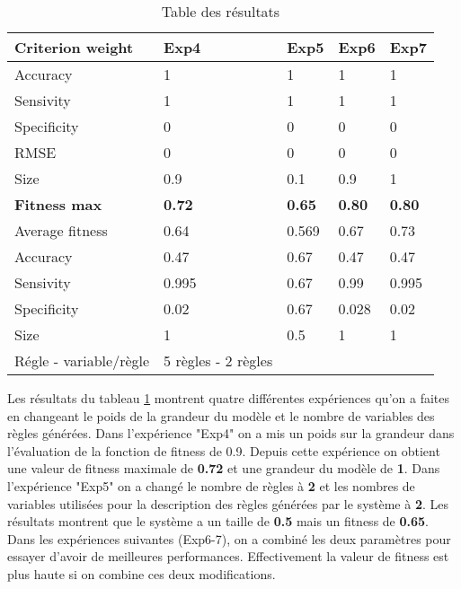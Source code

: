 \begin{table}[h]
  \centering
  \begin{tabular}{|l|l|l|l|l|}
  \hline
  \textbf{Criterion weight} & \textbf{Exp4} & \textbf{Exp5} & \textbf{Exp6} & \textbf{Exp7} \\ \hline
  Accuracy                 & 1             & 1             & 1             & 1             \\ \hline
  Sensivity                & 1             & 1             & 1             & 1             \\ \hline
  Specificity              & 0             & 0             & 0             & 0             \\ \hline
  RMSE                     & 0             & 0             & 0             & 0             \\ \hline
  Size                     & 0.9           & 0.1           & 0.9           & 1             \\ \hline
  \textbf{Fitness max}     & \textbf{0.72} & \textbf{0.65} & \textbf{0.80} & \textbf{0.80} \\ \hline
  Average fitness          & 0.64          & 0.569         & 0.67          & 0.73          \\ \hline
  Accuracy                 & 0.47          & 0.67          & 0.47          & 0.47          \\ \hline
  Sensivity                & 0.995         & 0.67          & 0.99          & 0.995         \\ \hline
  Specificity              & 0.02          & 0.67          & 0.028         & 0.02          \\ \hline
  Size                     & 1             & 0.5           & 1             & 1             \\ \hline
  Régle - variable/règle  & 5 règles - 2 règles      &        &               &               \\ \hline
  \end{tabular}
  \caption{\label{table4}Table des résultats}
\end{table}

Les résultats du tableau \ref{table4} montrent quatre différentes expériences qu’on a faites en changeant le poids de la grandeur du modèle et le nombre de variables des règles générées. Dans l'expérience "Exp4" on a mis un poids sur la grandeur dans l'évaluation de la fonction de fitness de 0.9. Depuis cette expérience on obtient une valeur de fitness maximale de \textbf{0.72} et une grandeur du modèle de \textbf{1}. Dans l'expérience "Exp5" on a changé le nombre de règles à \textbf{2} et les nombres de variables utilisées pour la description des règles générées par le système à \textbf{2}. Les résultats montrent que le système a un taille de \textbf{0.5} mais un fitness de \textbf{0.65}.
Dans les expériences suivantes (Exp6-7), on a combiné les deux paramètres pour essayer d'avoir de meilleures performances. Effectivement la valeur de fitness est plus haute si on combine ces deux modifications.





 
 
 
 

